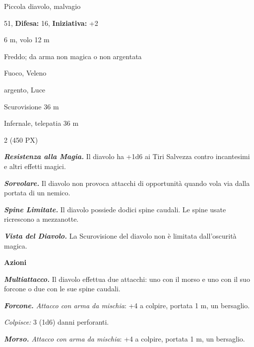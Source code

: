 \begin{multicols}{2}
{
\noindent
\begin{description}[noitemsep, topsep=0pt, parsep=0pt, partopsep=0pt, leftmargin=0cm, labelwidth=2.2cm]
	\item[\textbf{Taglia/Tipo:}] Piccola diavolo, malvagio
	\item[\textbf{Caratt.:}] 
	\item[\textbf{Punti Ferita:}] 51,  \textbf{Difesa:} 16,  \textbf{Iniziativa:} +2
	\item[\textbf{Movimento:}] 6 m, volo 12 m
	\item[\textbf{Tiri Salvez.:}] 
	\item[\textbf{Res. Danni:}] Freddo; da arma non magica o non argentata
	\item[\textbf{Imm. Danni:}] Fuoco, Veleno
	\item[\textbf{Vulnerabilità:}] argento, Luce
	\item[\textbf{Sensi:}] Scurovisione 36 m
	\item[\textbf{Linguaggi:}] Infernale, telepatia 36 m
	\item[\textbf{Sfida:}] 2 (450 PX)\smallskip
\end{description}

\emph{\textbf{Resistenza alla Magia.}} Il diavolo ha +1d6 ai Tiri Salvezza contro incantesimi e altri effetti magici.

\emph{\textbf{Sorvolare.}} Il diavolo non provoca attacchi di opportunità quando vola via dalla portata di un nemico.

\emph{\textbf{Spine Limitate.}} Il diavolo possiede dodici spine caudali. Le spine usate ricrescono a mezzanotte.

\emph{\textbf{Vista del Diavolo.}} La Scurovisione del diavolo non è limitata dall'oscurità magica.

\textbf{Azioni}

\emph{\textbf{Multiattacco.}} Il diavolo effettua due attacchi: uno con il morso e uno con il suo forcone o due con le sue spine caudali.

\emph{\textbf{Forcone.} Attacco con arma da mischia}: +4 a colpire, portata 1 m, un bersaglio.

\emph{Colpisce:} 3 (1d6) danni perforanti.

\emph{\textbf{Morso.} Attacco con arma da mischia}: +4 a colpire, portata 1 m, un bersaglio.

}
\end{multicols}
